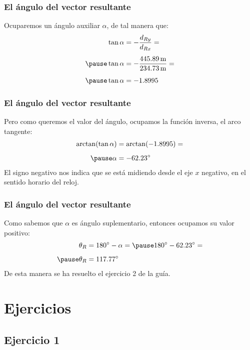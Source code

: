 \documentclass[12pt]{beamer}
\begin{document}
\begin{frame}
\frametitle{El ángulo del vector resultante}
Ocuparemos un ángulo auxiliar $\alpha$, de tal manera que:
\pause
\begin{eqnarray*}
\begin{aligned}
\tan \alpha &= - \dfrac{d_{Ry}}{d_{Rx}} = \\[0.5em] \pause
\tan \alpha &= - \dfrac{\SI{445.89}{\meter}}{\SI{234.73}{\meter}} = \\[0.5em] \pause
\tan \alpha &= - 1.8995
\end{aligned}
\end{eqnarray*}
\end{frame}
\begin{frame}
\frametitle{El ángulo del vector resultante}
Pero como queremos el valor del ángulo, ocupamos la función inversa, el arco tangente:
\pause
\begin{eqnarray*}
\begin{aligned}
\arctan(\tan \alpha) &= \arctan(-1.8995) = \\[0.5em] \pause
\alpha &= -\ang{62.23}
\end{aligned}
\end{eqnarray*}
\pause
El signo negativo nos indica que se está midiendo desde el eje $x$ negativo, en el sentido horario del reloj.
\end{frame}
\begin{frame}
\frametitle{El ángulo del vector resultante}
Como sabemos que $\alpha$ es ángulo suplementario, entonces ocupamos su valor positivo:
\pause
\begin{eqnarray*}
\begin{aligned}
\theta_{R} &= \ang{180} - \alpha = \pause \ang{180} - \ang{62.23} = \\[0.5em] \pause
\theta_{R} &= \ang{117.77}
\end{aligned}
\end{eqnarray*}
\pause
De esta manera se ha resuelto el ejercicio 2 de la guía.
\end{frame}

\section{Ejercicios}
\subsection{Ejercicio 1}
\end{document}
